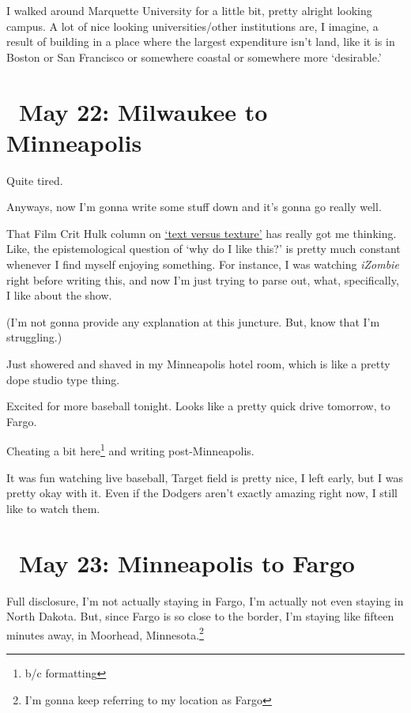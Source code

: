 \documentclass[../butidigress.tex]{subfiles}
\begin{document}
I walked around Marquette University for a little bit, pretty alright looking campus.
A lot of nice looking universities/other institutions are, I imagine, a result of building in a place where the largest expenditure isn't land, like it is in Boston or San Francisco or somewhere coastal or somewhere more `desirable.'

\section{\ May 22: Milwaukee to Minneapolis}
Quite tired.

Anyways, now I'm gonna write some stuff down and it's gonna go really well.

That Film Crit Hulk column on \href{http://observer.com/2018/05/the-two-crucial-filmmaking-elements-causing-all-your-movie-feuds/}{`text versus texture'} has really got me thinking.
Like, the epistemological question of `why do I like this?' is pretty much constant whenever I find myself enjoying something.
For instance, I was watching \textit{iZombie} right before writing this, and now I'm just trying to parse out, what, specifically, I like about the show.

(I'm not gonna provide any explanation at this juncture.
But, know that I'm struggling.)

\entryskip

Just showered and shaved in my Minneapolis hotel room, which is like a pretty dope studio type thing.

Excited for more baseball tonight.
Looks like a pretty quick drive tomorrow, to Fargo.

Cheating a bit here\footnote{b/c formatting} and writing post-Minneapolis.

It was fun watching live baseball, Target field is pretty nice, I left early, but I was pretty okay with it.
Even if the Dodgers aren't exactly amazing right now, I still like to watch them.

\section{\ May 23: Minneapolis to Fargo}
Full disclosure, I'm not actually staying in Fargo, I'm actually not even staying in North Dakota.
But, since Fargo is so close to the border, I'm staying like fifteen minutes away, in Moorhead, Minnesota.\footnote{I'm gonna keep referring to my location as Fargo}
\end{document}

